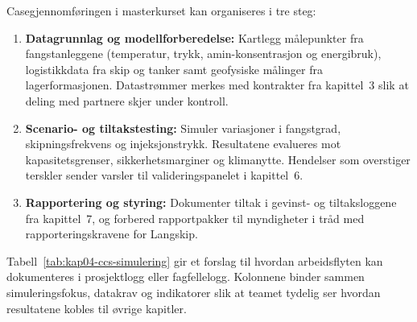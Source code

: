 Casegjennomføringen i masterkurset kan organiseres i tre steg:
\begin{enumerate}
    \item \textbf{Datagrunnlag og modellforberedelse:} Kartlegg målepunkter fra fangstanleggene (temperatur, trykk, amin-konsentrasjon og energibruk), logistikkdata fra skip og tanker samt geofysiske målinger fra lagerformasjonen. Datastrømmer merkes med kontrakter fra kapittel~3 slik at deling med partnere skjer under kontroll.
    \item \textbf{Scenario- og tiltakstesting:} Simuler variasjoner i fangstgrad, skipningsfrekvens og injeksjonstrykk. Resultatene evalueres mot kapasitetsgrenser, sikkerhetsmarginer og klimanytte. Hendelser som overstiger terskler sender varsler til valideringspanelet i kapittel~6.
    \item \textbf{Rapportering og styring:} Dokumenter tiltak i gevinst- og tiltaksloggene fra kapittel~7, og forbered rapportpakker til myndigheter i tråd med rapporteringskravene for Langskip.
\end{enumerate}

Tabell~\ref{tab:kap04-ccs-simulering} gir et forslag til hvordan arbeidsflyten kan dokumenteres i prosjektlogg eller fagfellelogg. Kolonnene binder sammen simuleringsfokus, datakrav og indikatorer slik at teamet tydelig ser hvordan resultatene kobles til øvrige kapitler.

